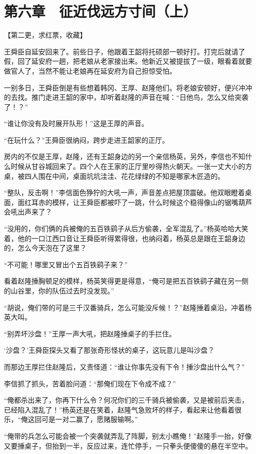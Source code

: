 \section{第六章　征近伐远方寸间（上）}

【第二更，求红票，收藏】

王舜臣自延安回来了。前些日子，他跟着王韶将托硕部一顿好打。打完后就请了假，回了延安府一趟，把老娘从老家接出来。他新近又被提拔了一级，眼看着就要做官人了，当然不能让老娘再在延安府为自己担惊受怕。

一别多日，王舜臣倒是有些想着韩冈、王厚、赵隆他们。将老娘安顿好，便兴冲冲的去找。推门走进王韶的家中，却听着赵隆的声音在喊：“日他鸟，怎么又给突袭了！？”

“谁让你没有及时展开队形！”这是王厚的声音。

“在玩什么？”王舜臣很纳闷，跨步走进王韶家的正厅。

房内的不仅是王厚，赵隆，还有王韶身边的另一个亲信杨英，另外，李信也不知什么时候从甘谷城回来了。四个人在王家的正厅里吵得热火朝天。一张一丈大小的方桌，被四人围在中间，桌面坑坑洼洼、花花绿绿的不知是哪家木匠造的。

“整队，反击啊！”李信面色狰狞的大吼一声，声音差点把屋顶震破。他双眼瞪着桌面，面红耳赤的模样，让王舜臣都被吓了一跳，什么时候这个稳得像山的锯嘴葫芦会吼出声来了？

“没用的，你们俩的兵被俺的五百铁鹞子从后方偷袭，全军混乱了。”杨英哈哈大笑着，他的一口江西口音让王舜臣听得累得很，也纳闷着，杨英总是跟在王韶身边的，怎么今天泡在了这里？

“不可能！哪里又冒出个五百铁鹞子来？”

看着赵隆捶胸顿足的模样，杨英笑得更是得意，“俺可是把五百铁鹞子藏在另一侧的山谷里，你的队伍过去时没发现。”

“胡说，俺们带的可是三千汉番骑兵，怎么可能没斥候！？”赵隆捶着桌沿，冲着杨英大叫。

“别弄坏沙盘！”王厚一声大吼，把赵隆捶桌子的手拦住。

‘沙盘？’王舜臣探头又看了那张奇形怪状的桌子，这玩意儿是叫沙盘？

而那边王厚拦住赵隆后，又责怪道：“谁让你事先没有下令！捶沙盘出什么气？”

李信抓了抓头，苦着脸问道：“那俺们现在下令成不成？”

“俺都杀出来了，你再下什么令？何况你们的三千骑兵被偷袭，又是被前后夹击，已经陷入混乱了！”杨英还是在笑着，赵隆气急败坏的样子，看起来让他看着很乐，“俺这回可是一对二赢了，愿赌服输啊。”

“俺带的兵怎么可能会被一个突袭就弄乱了阵脚，别太小瞧俺！”赵隆手一抬，好像又要捶桌子，但抬到一半，反应过来，连忙停手，一只拳头便傻傻的悬在半空中。

